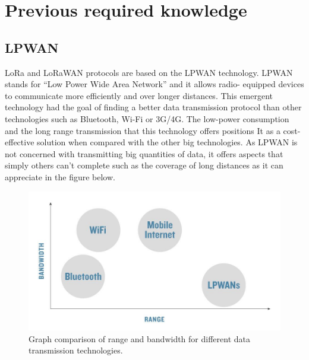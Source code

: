 
\chapter{Previous required knowledge}
\label{chap:first}
\ifpdf
    \graphicspath{{Chapter1/Figures/PNG/}{Chapter1/Figures/PDF/}{Chapter1/Figures/}}
\else
    \graphicspath{{Chapter1/Figures/EPS/}{Chapter1/Figures/}}
\fi


\section{LPWAN}
\label{sec:f-lpwan}
LoRa and LoRaWAN protocols are based on the LPWAN technology.
LPWAN stands for “Low Power Wide Area Network” and it allows radio-
equipped devices to communicate more efficiently and over longer
distances. This emergent technology had the goal of finding a better
data transmission protocol than other technologies such as Bluetooth,
Wi-Fi or 3G/4G. The low-power consumption and the long range
transmission that this technology offers positions It as a cost-effective
solution when compared with the other big technologies. As LPWAN is
not concerned with transmitting big quantities of data, it offers aspects
that simply others can't complete such as the coverage of long distances
as it can appreciate in the figure below.
\begin{figure}[htbp]
\includegraphics[width=\linewidth]{rangevsband.png}
\caption{Graph comparison of range and bandwidth for different data transmission technologies.}
\end{figure}

